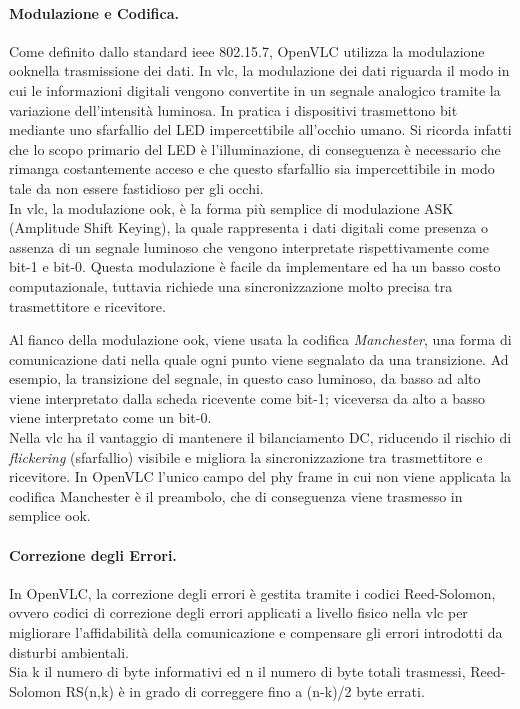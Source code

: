 \paragraph{Modulazione e Codifica.}
\noindent Come definito dallo standard \gls{ieee} 802.15.7, OpenVLC utilizza la modulazione \gls{ook}\glsfirstoccur nella trasmissione dei dati. In \gls{vlc}, la modulazione dei dati riguarda il modo in cui le informazioni digitali vengono convertite in un segnale analogico tramite la variazione dell'intensità luminosa. In pratica i dispositivi trasmettono bit mediante uno sfarfallio del LED impercettibile all'occhio umano. Si ricorda infatti che lo scopo primario del LED è l'illuminazione, di conseguenza è necessario che rimanga costantemente acceso e che questo sfarfallio sia impercettibile in modo tale da non essere fastidioso per gli occhi.\\
In \gls{vlc}, la modulazione \gls{ook}, è la forma più semplice di modulazione ASK (Amplitude Shift Keying), la quale rappresenta i dati digitali come presenza o assenza di un segnale luminoso che vengono interpretate rispettivamente come bit-1 e bit-0. Questa modulazione è facile da implementare ed ha un basso costo computazionale, tuttavia richiede una sincronizzazione molto precisa tra trasmettitore e ricevitore.

Al fianco della modulazione \gls{ook}, viene usata la codifica \textit{Manchester}, una forma di comunicazione dati nella quale ogni punto viene segnalato da una transizione. Ad esempio, la transizione del segnale, in questo caso luminoso, da basso ad alto viene interpretato dalla scheda ricevente come bit-1; viceversa da alto a basso viene interpretato come un bit-0.\\
Nella \gls{vlc} ha il vantaggio di mantenere il bilanciamento DC, riducendo il rischio di \textit{flickering} (sfarfallio) visibile e migliora la sincronizzazione tra trasmettitore e ricevitore.
In OpenVLC l'unico campo del \gls{phy} frame in cui non viene applicata la codifica Manchester è il preambolo, che di conseguenza viene trasmesso in semplice \gls{ook}.

\paragraph{Correzione degli Errori.}
In OpenVLC, la correzione degli errori è gestita tramite i codici Reed-Solomon, ovvero codici di correzione degli errori applicati a livello fisico nella \gls{vlc} per migliorare l'affidabilità della comunicazione e compensare gli errori introdotti da disturbi ambientali.\\
Sia k il numero di byte informativi ed n il numero di byte totali trasmessi, Reed-Solomon RS(n,k) è in grado di correggere fino a (n-k)/2 byte errati.

